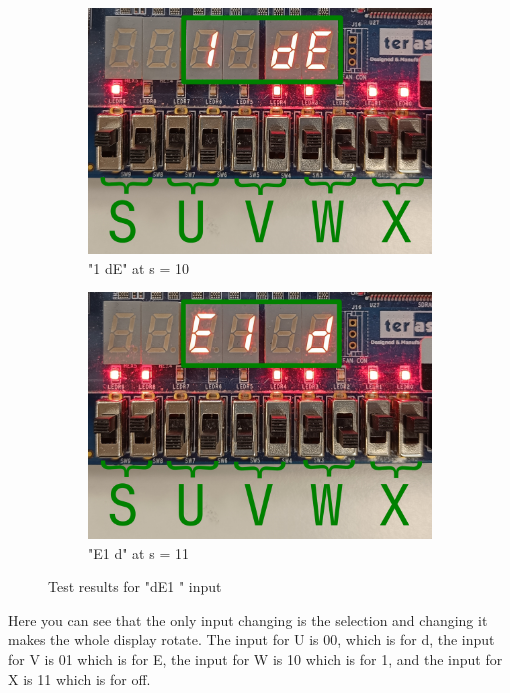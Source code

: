 \documentclass{article}
\begin{document}
\begin{figure}[h]
    \begin{subfigure}{0.45\textwidth}
        \centering
        \includegraphics[width=1\textwidth]{Figures/Part5_dE1_10.png}
        \caption{"1 dE" at s = 10}
        \label{fig:T05de1pic3}
    \end{subfigure}
    \hfill
    \begin{subfigure}{0.45\textwidth}
        \centering
        \includegraphics[width=1\textwidth]{Figures/Part5_dE1_11.png}
        \caption{"E1 d" at s = 11}
        \label{fig:T05de1pic4}
    \end{subfigure}
    \caption{Test results for "dE1 " input}
    \label{fig:T05de1pic}
\end{figure}
Here you can see that the only input changing is the selection and changing it makes the whole display rotate. The input for U is 00, which is for d, the input for V is  01 which is for E, the input for W is 10 which is for 1, and the input for X is 11 which is for off.
\end{document}
